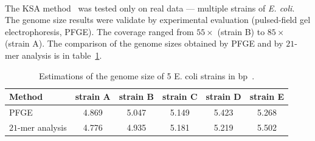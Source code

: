 \paragraph{}The KSA method~\cite{williams} was tested only on real data --- multiple strains of \emph{E. coli}. The genome size results were validate by experimental evaluation (pulsed-field gel electrophoresis, PFGE). The coverage ranged from $55\times$ (strain B) to $85\times$ (strain A). The comparison of the genome sizes obtained by PFGE and by $21$-mer analysis is in table~\ref{tab:williams}. 
\begin{table}[htbp]
\centering
\begin{tabular}{lccccc}
\toprule
Method & strain A & strain B & strain C & strain D & strain E\\
\midrule
PFGE & 4.869 & 5.047 & 5.149 & 5.423 & 5.268\\
$21$-mer analysis & 4.776 & 4.935 & 5.181 & 5.219 & 5.502\\
\bottomrule
\end{tabular}
\caption[Estimations of the genome size of 5 E. coli strains]{Estimations of the genome size of 5 E. coli strains in bp~\cite{williams}.}\label{tab:williams}
\end{table}

